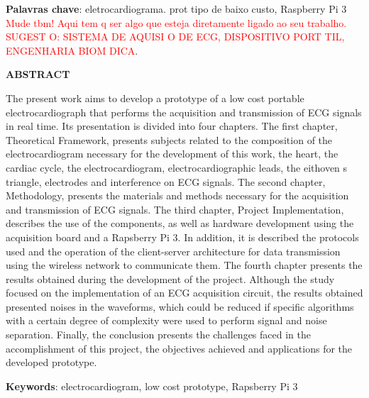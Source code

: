 \documentclass{article}
\begin{document}
\textbf{Palavras chave}: eletrocardiograma. prot tipo de baixo custo, Raspberry Pi 3 \textcolor{red}{Mude tbm! Aqui tem q ser algo que esteja diretamente ligado ao seu trabalho. SUGEST O: SISTEMA DE AQUISI O DE ECG, DISPOSITIVO PORT TIL, ENGENHARIA BIOM DICA}.  
\newpage
\thispagestyle{empty}
\vspace*{4.4cm}
{\begin{center}\textbf{\normalsize ABSTRACT}\vspace{36pt}\end{center}}
The present work aims to develop a prototype of a low cost portable electrocardiograph that performs the acquisition and transmission of ECG signals in real time. Its presentation is divided into four chapters. The first chapter, Theoretical Framework, presents subjects related to the composition of the electrocardiogram necessary for the development of this work, the heart, the cardiac cycle, the electrocardiogram, electrocardiographic leads, the eithoven s triangle, electrodes and interference on ECG signals. The second chapter, Methodology, presents the materials and methods necessary for the acquisition and transmission of ECG signals. The third chapter, Project Implementation, describes the use of the components, as well as hardware development using the acquisition board and a Rapsberry Pi 3. In addition, it is described the protocols used and the operation of the client-server architecture for data transmission using the wireless network to communicate them. The fourth chapter presents the results obtained during the development of the project. Although the study focused on the implementation of an ECG acquisition circuit, the results obtained presented noises in the waveforms, which could be reduced if specific algorithms with a certain degree of complexity were used to perform signal and noise separation. Finally, the conclusion presents the challenges faced in the accomplishment of this project, the objectives achieved and applications for the developed prototype.


\textbf{Keywords}: electrocardiogram, low cost prototype, Rapsberry Pi 3



\newpage
\pagestyle{empty}
\vspace*{4cm}





\newpage
\pagestyle{empty}
\vspace*{3.5cm}
\renewcommand{\contentsname}{\begin{center}\textbf{\normalsize SUM RIO}\vspace{36pt}\end{center}}
\end{document}
